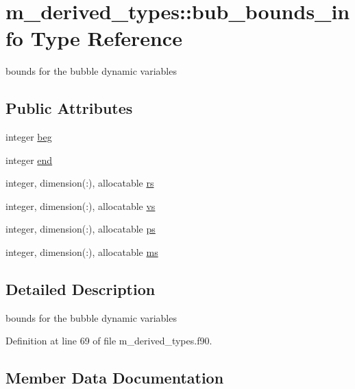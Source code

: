 \hypertarget{structm__derived__types_1_1bub__bounds__info}{}\section{m\+\_\+derived\+\_\+types\+:\+:bub\+\_\+bounds\+\_\+info Type Reference}
\label{structm__derived__types_1_1bub__bounds__info}


bounds for the bubble dynamic variables  


\subsection*{Public Attributes}
\begin{DoxyCompactItemize}
\item 
integer \hyperlink{structm__derived__types_1_1bub__bounds__info_af1cd7c7f30de05a0f9ee49f5d23ef354}{beg}
\item 
integer \hyperlink{structm__derived__types_1_1bub__bounds__info_a01730fa85d33e3174561ad5182d2e052}{end}
\item 
integer, dimension(\+:), allocatable \hyperlink{structm__derived__types_1_1bub__bounds__info_aa3a7d88d4bc7e857c54d3e7b09784f85}{rs}
\item 
integer, dimension(\+:), allocatable \hyperlink{structm__derived__types_1_1bub__bounds__info_aafe6965d5ebb0a946bda443cfdd6b840}{vs}
\item 
integer, dimension(\+:), allocatable \hyperlink{structm__derived__types_1_1bub__bounds__info_a6bed3e7dc94afeeb61216758ecf733dd}{ps}
\item 
integer, dimension(\+:), allocatable \hyperlink{structm__derived__types_1_1bub__bounds__info_a0aeed04f8b8072c124ed2cec4e23e78c}{ms}
\end{DoxyCompactItemize}


\subsection{Detailed Description}
bounds for the bubble dynamic variables 

Definition at line 69 of file m\+\_\+derived\+\_\+types.\+f90.



\subsection{Member Data Documentation}
\mbox{\label{structm__derived__types_1_1bub__bounds__info_af1cd7c7f30de05a0f9ee49f5d23ef354}} 
